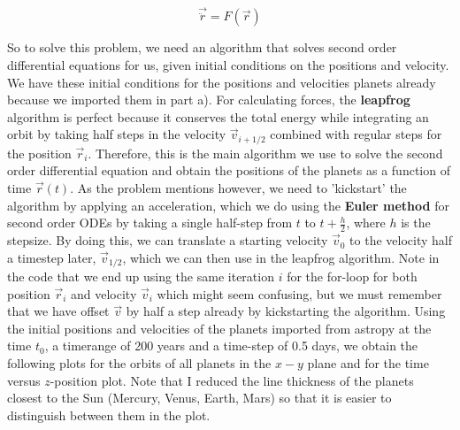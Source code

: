 \begin{equation}
 \vec{\ddot{r}} = F(\vec{r})
\end{equation}

So to solve this problem, we need an algorithm that solves second order differential equations for us, given initial conditions on the positions and velocity. We have these initial conditions for the positions and velocities planets already because we imported them in part a). For calculating forces, the \textbf{leapfrog} algorithm is perfect because it conserves the total energy while integrating an orbit by taking half steps in the velocity $\vec{v}_{i+1/2}$ combined with regular steps for the position $\vec{r}_i$. Therefore, this is the main algorithm we use to solve the second order differential equation and obtain the positions of the planets as a function of time $\vec{r}(t)$. As the problem mentions however, we need to 'kickstart' the algorithm by applying an acceleration, which we do using the \textbf{Euler method} for second order ODEs by taking a single half-step from $t$ to $t + \frac{h}{2}$, where $h$ is the stepsize. By doing this, we can translate a starting velocity $\vec{v}_0$ to the velocity half a timestep later, $\vec{v}_{1/2}$, which we can then use in the leapfrog algorithm. Note in the code that we end up using the same iteration $i$ for the for-loop for both position $\vec{r}_i$ and velocity $\vec{v}_i$ which might seem confusing, but we must remember that we have offset $\vec{v}$ by half a step already by kickstarting the algorithm. Using the initial positions and velocities of the planets imported from astropy at the time $t_0$, a timerange of 200 years and a time-step of 0.5 days, we obtain the following plots for the orbits of all planets in the $x-y$ plane and for the time versus $z$-position plot. Note that I reduced the line thickness of the planets closest to the Sun (Mercury, Venus, Earth, Mars) so that it is easier to distinguish between them in the plot. 



